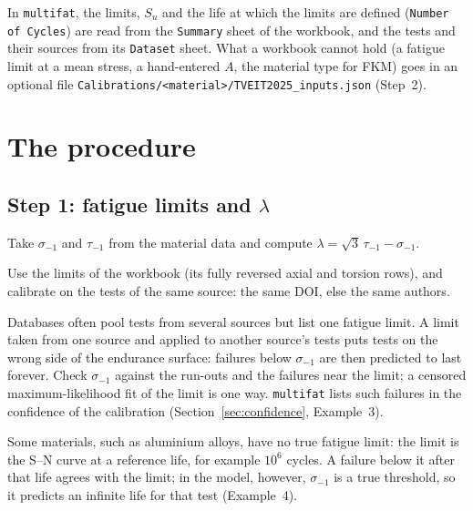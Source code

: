 \documentclass[11pt,a4paper]{article}
\newcommand{\sigm}{\sigma_{-1}}
\newcommand{\taum}{\tau_{-1}}
\newcommand{\Su}{S_u}
\newcommand{\code}[1]{\texttt{#1}}
\begin{document}
In \texttt{multifat}, the limits, $\Su$ and the life at which the limits are defined (\code{Number of Cycles}) are
read from the \code{Summary} sheet of the workbook, and the tests and their sources from its \code{Dataset} sheet.
What a workbook cannot hold (a fatigue limit at a mean stress, a hand-entered $A$, the material type for FKM) goes
in an optional file \code{Calibrations/<material>/TVEIT2025\_inputs.json} (Step~2).

\FloatBarrier
\section{The procedure}\label{sec:procedure}

\subsection*{Step 1: fatigue limits and $\lambda$}
Take $\sigm$ and $\taum$ from the material data and compute $\lambda=\sqrt3\,\taum-\sigm$.

\begin{rulebox}
Use the limits of the workbook (its fully reversed axial and torsion rows), and calibrate on the tests of the same
source: the same DOI, else the same authors.
\end{rulebox}

\begin{pitfall}
Databases often pool tests from several sources but list one fatigue limit. A limit taken from one source and applied
to another source's tests puts tests on the wrong side of the endurance surface: failures below $\sigm$ are then
predicted to last forever. Check $\sigm$ against the run-outs and the failures near the limit; a censored maximum-likelihood
fit of the limit is one way. \texttt{multifat} lists such failures in the confidence of the calibration
(Section~\ref{sec:confidence}, Example~3).
\end{pitfall}

\begin{pitfall}
Some materials, such as aluminium alloys, have no true fatigue limit: the limit is the S--N curve at a reference life,
for example $10^6$ cycles. A failure below it after that life agrees with the limit; in the model, however, $\sigm$
is a true threshold, so it predicts an infinite life for that test (Example~4).
\end{pitfall}
\end{document}
